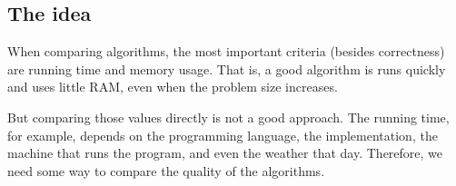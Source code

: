 \subsection{The idea}
When comparing algorithms, the most important criteria (besides correctness)
are running time and memory usage.
That is, a good algorithm is runs quickly and uses little RAM,
even when the problem size increases.

But comparing those values directly is not a good approach.
The running time, for example, depends on the programming language,
the implementation, the machine that runs the program,
and even the weather that day.
Therefore, we need some way to compare the quality of the algorithms.
